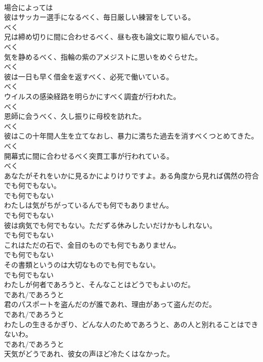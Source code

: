 \documentclass[8pt]{extreport}
\begin{document}
\begin{CJK}{UTF8}{min}
\\	場合によっては
\\	彼はサッカー選手になるべく、毎日厳しい練習をしている。	
\\	べく
\\	兄は締め切りに間に合わせるべく、昼も夜も論文に取り組んでいる。	
\\	べく
\\	気を静めるべく、指輪の紫のアメジストに思いをめぐらせた。	
\\	べく
\\	彼は一日も早く借金を返すべく、必死で働いている。	
\\	べく
\\	ウイルスの感染経路を明らかにすべく調査が行われた。	
\\	べく
\\	恩師に会うべく、久し振りに母校を訪れた。	
\\	べく
\\	彼はこの十年間人生を立てなおし、暴力に満ちた過去を消すべくつとめてきた。	
\\	べく
\\	開幕式に間に合わせるべく突貫工事が行われている。	
\\	べく
\\	あなたがそれをいかに見るかによりけりですよ。ある角度から見れば偶然の符合でも何でもない。	
\\	でも何でもない
\\	わたしは気がちがっているんでも何でもありません。	
\\	でも何でもない
\\	彼は病気でも何でもない。ただずる休みしたいだけかもしれない。	
\\	でも何でもない
\\	これはただの石で、金目のものでも何でもありません。	
\\	でも何でもない
\\	その書類というのは大切なものでも何でもない。	
\\	でも何でもない
\\	わたしが何者であろうと、そんなことはどうでもよいのだ。	
\\	であれ/であろうと
\\	君のパスポートを盗んだのが誰であれ、理由があって盗んだのだ。	
\\	であれ/であろうと
\\	わたしの生きるかぎり、どんな人のためであろうと、あの人と別れることはできないわ。	
\\	であれ/であろうと
\\	天気がどうであれ、彼女の声ほど冷たくはなかった。	

\end{CJK}
\end{document}
